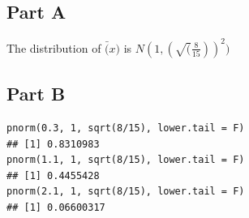\documentclass{article}\usepackage[]{graphicx}\usepackage[]{color}
\makeatletter
\newenvironment{kframe}{%
 \def\at@end@of@kframe{}%
 \ifinner\ifhmode%
  \def\at@end@of@kframe{\end{minipage}}%
  \begin{minipage}{\columnwidth}%
 \fi\fi%
 \def\FrameCommand##1{\hskip\@totalleftmargin \hskip-\fboxsep
 \colorbox{shadecolor}{##1}\hskip-\fboxsep
     \hskip-\linewidth \hskip-\@totalleftmargin \hskip\columnwidth}%
 \MakeFramed {\advance\hsize-\width
   \@totalleftmargin\z@ \linewidth\hsize
   \@setminipage}}%
 {\par\unskip\endMakeFramed%
 \at@end@of@kframe}
\newenvironment{knitrout}{}{} %
\makeatother
\begin{document}
\subsection*{Part A}
The distribution of $\bar(x)$ is $N(1, (\sqrt(\frac{8}{15}))^2)$
\subsection*{Part B}
\begin{knitrout}
\color{fgcolor}\begin{kframe}
\begin{verbatim}
pnorm(0.3, 1, sqrt(8/15), lower.tail = F)
## [1] 0.8310983
pnorm(1.1, 1, sqrt(8/15), lower.tail = F)
## [1] 0.4455428
pnorm(2.1, 1, sqrt(8/15), lower.tail = F)
## [1] 0.06600317
\end{verbatim}
\end{kframe}
\end{knitrout}
\end{document}
